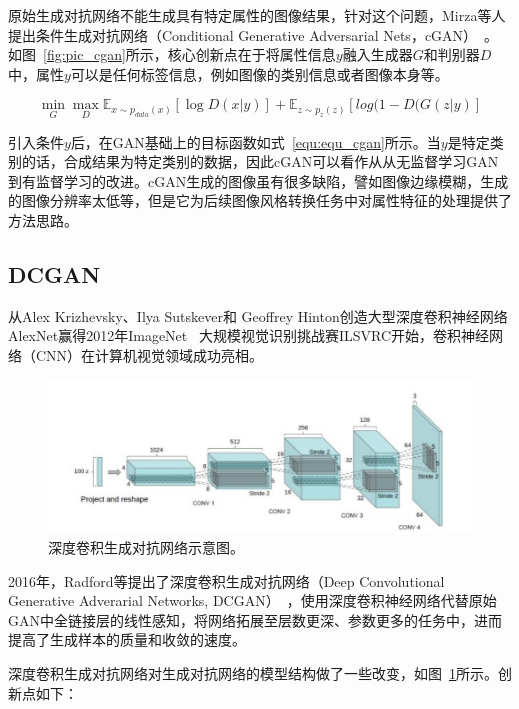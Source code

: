 原始生成对抗网络不能生成具有特定属性的图像结果，针对这个问题，Mirza等人提出条件生成对抗网络（Conditional Generative Adversarial Nets，cGAN）~\citep{mirza2014conditional}。如图~\ref{fig:pic_cgan}所示，核心创新点在于将属性信息$y$融入生成器$G$和判别器$D$中，属性$y$可以是任何标签信息，例如图像的类别信息或者图像本身等。

\begin{equation}
\label{equ:equ_cgan}
\mathop{min} \limits_{G} \mathop{max} \limits_{D} \mathbb{E}_{x \sim p_{data}(x)}[\log D(x|y)] + \mathbb{E}_{z \sim p_{z}(z)}[log(1-D(G(z|y)]
\end{equation}

引入条件$y$后，在GAN基础上的目标函数如式~\ref{equ:equ_cgan}所示。当$y$是特定类别的话，合成结果为特定类别的数据，因此cGAN可以看作从从无监督学习GAN到有监督学习的改进。cGAN生成的图像虽有很多缺陷，譬如图像边缘模糊，生成的图像分辨率太低等，但是它为后续图像风格转换任务中对属性特征的处理提供了方法思路。


\subsection{DCGAN}
从Alex Krizhevsky、Ilya Sutskever和 Geoffrey Hinton创造大型深度卷积神经网络AlexNet\cite{krizhevsky2017imagenet}赢得2012年ImageNet~\cite{deng2009imagenet} 大规模视觉识别挑战赛ILSVRC开始，卷积神经网络（CNN）在计算机视觉领域成功亮相。

\begin{figure}[ht]
    \centering
	\includegraphics[width=\textwidth]{figures/dcgan.pdf}
	\caption{深度卷积生成对抗网络示意图。}
	\label{fig:pic_dcgan}
\end{figure}

2016年，Radford等提出了深度卷积生成对抗网络（Deep Convolutional Generative Adverarial Networks, DCGAN）~\cite{radford2015unsupervised}，使用深度卷积神经网络代替原始GAN中全链接层的线性感知，将网络拓展至层数更深、参数更多的任务中，进而提高了生成样本的质量和收敛的速度。

深度卷积生成对抗网络对生成对抗网络的模型结构做了一些改变，如图~\ref{fig:pic_dcgan}所示。创新点如下：

